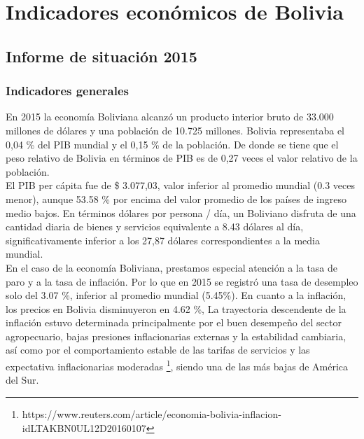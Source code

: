 
\chapter{Indicadores económicos de Bolivia}

\section{Informe de situación 2015}

    \subsection{Indicadores generales}
    En 2015 la economía Boliviana alcanzó un producto interior bruto de 33.000 millones de dólares y una población de 10.725 millones. Bolivia representaba el 0,04 \% del PIB mundial y el 0,15 \%  de la población. De donde se tiene que el peso relativo de Bolivia en términos de PIB es de 0,27 veces el valor relativo de la población.\\
    El PIB per cápita fue de \$ 3.077,03, valor inferior al promedio mundial (0.3 veces menor), aunque 53.58 \% por encima del valor promedio de los países de ingreso medio bajos. En términos dólares por persona / día, un Boliviano disfruta de una cantidad diaria de bienes y servicios equivalente a 8.43 dólares al día, significativamente inferior a los 27,87 dólares correspondientes a la media mundial.\\
    En el caso de la economía Boliviana, prestamos especial atención a la tasa de paro y a la tasa de inflación. Por lo que en 2015 se registró una tasa de desempleo solo del 3.07 \%, inferior al promedio mundial (5.45\%). En cuanto a la inflación, los precios en Bolivia disminuyeron en 4.62 \%, La trayectoria descendente de la inflación estuvo determinada principalmente por el buen desempeño del sector agropecuario, bajas presiones inflacionarias externas y la estabilidad cambiaria, así como por el comportamiento estable de las tarifas de servicios y las expectativa inflacionarias moderadas \footnote{https://www.reuters.com/article/economia-bolivia-inflacion-idLTAKBN0UL12D20160107}, siendo una de las más bajas de América del Sur. \\


